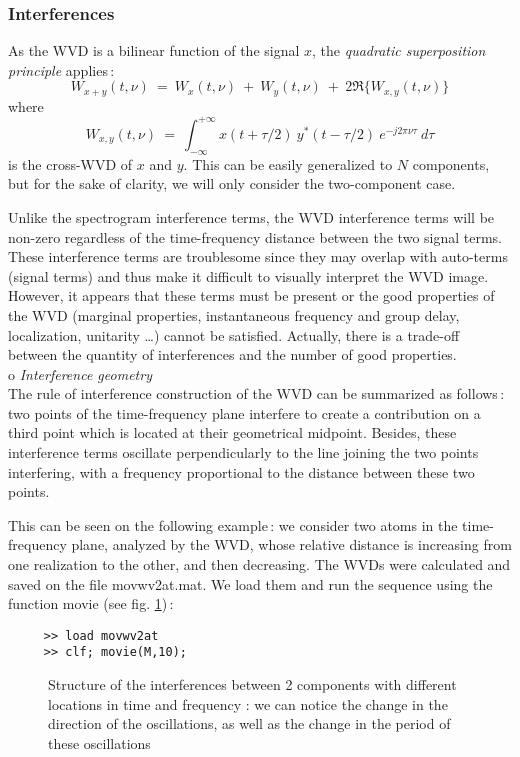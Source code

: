 \subsubsection{Interferences}
 As the WVD is a bilinear function of the signal $x$,
the {\it quadratic superposition principle} applies\,:
\[W_{x+y}(t,\nu)\ =\ W_x(t,\nu)\ +\ W_y(t,\nu)\ +\
2\Re{\{W_{x,y}(t,\nu)\}}\] 
where 
\[W_{x,y}(t,\nu)\ =\ \int_{-\infty}^{+\infty} x(t+\tau/2)\ y^*(t-\tau/2)\
e^{-j2\pi \nu \tau}\ d\tau\] 
is the cross-WVD of $x$ and $y$. This can be easily generalized to $N$
components, but for the sake of clarity, we will only consider the
two-component case.

  Unlike the spectrogram interference terms, the WVD interference terms
will be non-zero regardless of the time-frequency distance between the two
signal terms. These interference terms are troublesome since they may
overlap with auto-terms (signal terms) and thus make it difficult to
visually interpret the WVD image. However, it appears that these terms must
be present or the good properties of the WVD (marginal properties,
instantaneous frequency and group delay, localization, unitarity \ldots)
cannot be satisfied. Actually, there is a trade-off between the quantity of
interferences and the number of good properties.\\

  o {\it Interference geometry}\\
  The rule of interference construction of the WVD can be summarized as
follows\,: two points of the time-frequency plane interfere to create a
contribution on a third point which is located at their geometrical
midpoint. Besides, these interference terms oscillate perpendicularly to
the line joining the two points interfering, with a frequency proportional
to the distance between these two points.

  This can be seen on the following example\,: we consider two atoms in the
time-frequency plane, analyzed by the WVD, whose relative distance is
increasing from one realization to the other, and then decreasing. The WVDs
were calculated and saved on the file {\ttfamily movwv2at.mat}. We load
them and run the sequence using the function {\ttfamily movie} (see
fig. \ref{En1fig3})\,:
\begin{verbatim}
     >> load movwv2at
     >> clf; movie(M,10);
\end{verbatim}
\begin{figure}[htb]
\epsfxsize=10cm
\epsfysize=10cm
\centerline{}
\caption{\label{En1fig3}Structure of the interferences between
2 components with different locations in time and frequency : we can notice
the change in the direction of the oscillations, as well as the change in
the period of these oscillations}
\end{figure}

